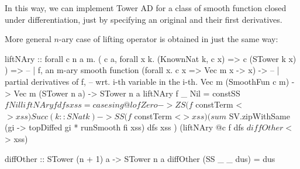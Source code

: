 In this way, we can implement Tower AD for a class of smooth function closed under differentiation, just by specifying an original and their first derivatives.

More general $n$-ary case of lifting operator is obtained in just the same way:

\begin{code}
liftNAry :: forall c n a m. 
    ( c a, forall x k. (KnownNat k, c x) => c (STower k x) ) =>
  -- | f, an m-ary smooth function
  (forall x. c x => Vec m x -> x) ->
  -- | partial derivatives of f,
  -- wrt. i-th variable in the i-th.
  Vec m (SmoothFun c m) ->
  Vec m (STower n a) ->
  STower n a
liftNAry f _ Nil = constSS $ f Nil
liftNAry f dfs xss =
  case sing @l of
    Zero -> ZS (f $ constTerm <$> xss)
    Succ (k :: SNat k) ->
      SS (f $ constTerm <$> xss)
         ( sum
         $ SV.zipWithSame 
            (\fi gi -> topDiffed gi * runSmooth fi xss)
           dfs xss
         )
         (liftNAry @c f dfs $ diffOther <$> xss)

diffOther :: STower (n + 1) a -> STower n a
diffOther (SS _ _ dus) = dus
\end{code}

\printbibliography

